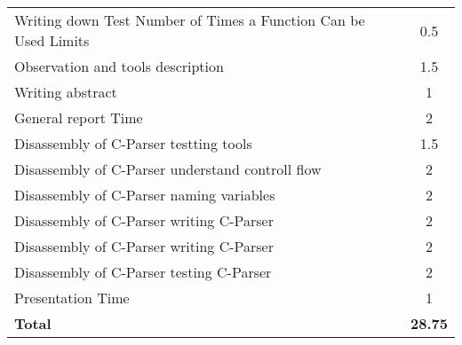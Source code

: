 \begin{table}[H]
\begin{tabular*}{\textwidth}{@{\extracolsep{\fill}} l c@{\extracolsep{0pt}} }
	Writing down Test Number of Times a Function Can be Used Limits & 0.5 \\
	Observation and tools description			& 1.5 \\
	Writing abstract							& 1 \\
	General report Time							& 2 \\
	Disassembly of C-Parser testting tools		& 1.5 \\
	Disassembly of C-Parser	understand controll flow	& 2 \\
	Disassembly of C-Parser	naming variables	& 2 \\
	Disassembly of C-Parser	writing C-Parser	& 2 \\
	Disassembly of C-Parser	writing C-Parser	& 2 \\
	Disassembly of C-Parser	testing C-Parser	& 2 \\
	Presentation Time 							& 1 \\
\hline\hline
\textbf{Total}									& \textbf{28.75}
\end{tabular*}
\end{table}
\clearpage

